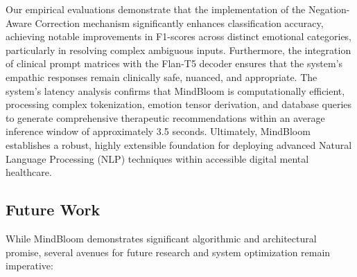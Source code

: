 \documentclass[12pt,twoside]{article}
\begin{document}
Our empirical evaluations demonstrate that the implementation of the Negation-Aware Correction mechanism significantly enhances classification accuracy, achieving notable improvements in F1-scores across distinct emotional categories, particularly in resolving complex ambiguous inputs. Furthermore, the integration of clinical prompt matrices with the Flan-T5 decoder ensures that the system's empathic responses remain clinically safe, nuanced, and appropriate. The system's latency analysis confirms that MindBloom is computationally efficient, processing complex tokenization, emotion tensor derivation, and database queries to generate comprehensive therapeutic recommendations within an average inference window of approximately 3.5 seconds. Ultimately, MindBloom establishes a robust, highly extensible foundation for deploying advanced Natural Language Processing (NLP) techniques within accessible digital mental healthcare.

\subsection{Future Work}

While MindBloom demonstrates significant algorithmic and architectural promise, several avenues for future research and system optimization remain imperative:
\end{document}

